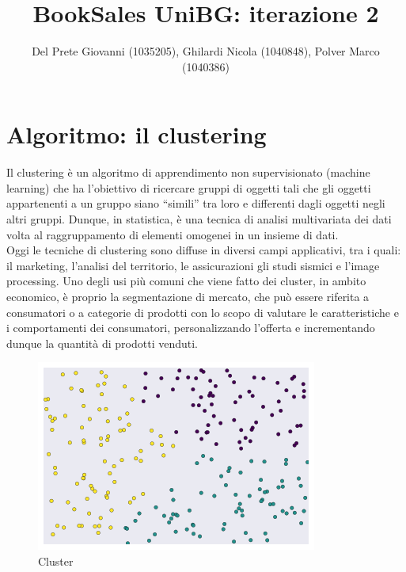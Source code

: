 \documentclass[10pt,a4paper]{article}
\author{Del Prete Giovanni (1035205), Ghilardi Nicola (1040848), Polver Marco (1040386)}
\title{BookSales UniBG: iterazione 2}
\begin{document}
	
	\maketitle
	\tableofcontents
	
	\section{Algoritmo: il clustering}
	Il clustering è un algoritmo di apprendimento non supervisionato (machine learning) che ha l'obiettivo di ricercare gruppi di oggetti tali che  
	gli oggetti appartenenti a un gruppo siano “simili” tra loro e differenti dagli oggetti negli altri gruppi. Dunque, in statistica, è una tecnica di 
        analisi multivariata dei dati volta al raggruppamento di elementi omogenei in un insieme di dati.\\
        Oggi le tecniche di clustering sono diffuse in diversi campi applicativi, tra i quali: il marketing, l'analisi del territorio, le assicurazioni  gli studi sismici e l'image processing.  Uno degli usi più comuni che viene fatto dei cluster, in ambito economico, 
        è proprio la segmentazione di mercato, che può essere riferita a consumatori o a categorie di prodotti con lo scopo di valutare le caratteristiche e i comportamenti dei consumatori, personalizzando l’offerta
        e incrementando dunque la quantità di prodotti venduti.
              \begin{figure}[H]
		\centering
		\includegraphics[scale=0.9]{Cluster.png}
		\caption{Cluster}
		\end{figure}
		\newpage        
\end{document}
